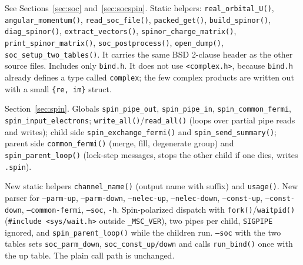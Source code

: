\documentclass[11pt,a4paper]{article}
\newcommand{\file}[1]{\texttt{#1}}
\newcommand{\fn}[1]{\texttt{#1()}}
\newcommand{\var}[1]{\texttt{#1}}
\newcommand{\opt}[1]{\texttt{#1}}
\begin{document}
\begin{description}[style=nextline,leftmargin=1.2em]
\item[\file{tightbind/soc.c} (new, about 960 lines)] See Sections~\ref{sec:soc}
  and~\ref{sec:socspin}. Static helpers: \fn{real\_orbital\_U}, \fn{angular\_momentum},
  \fn{read\_soc\_file}, \fn{packed\_get}, \fn{build\_spinor}, \fn{diag\_spinor},
  \fn{extract\_vectors}, \fn{spinor\_charge\_matrix}, \fn{print\_spinor\_matrix},
  \fn{soc\_postprocess}, \fn{open\_dump}, \fn{soc\_setup\_two\_tables}. It carries
  the same BSD 2-clause header as the other source files. Includes only
  \file{bind.h}. It does not use \texttt{<complex.h>}, because \file{bind.h} already
  defines a type called \texttt{complex}; the few complex products are written out with a
  small \texttt{\{re, im\}} struct.

\item[\file{tightbind/spin.c} (new, about 330 lines)] Section~\ref{sec:spin}.
  Globals \var{spin\_pipe\_out}, \var{spin\_pipe\_in}, \var{spin\_common\_fermi},
  \var{spin\_input\_electrons}; \fn{write\_all}/\fn{read\_all} (loops over partial
  pipe reads and writes); child side \fn{spin\_exchange\_fermi} and
  \fn{spin\_send\_summary}; parent side \fn{common\_fermi} (merge, fill, degenerate group)
  and \fn{spin\_parent\_loop} (lock-step messages, stops the other child if one dies,
  writes \texttt{.spin}).

\item[\file{tightbind/main.c}] New static helpers \fn{channel\_name} (output name with
  suffix) and \fn{usage}. New parser for \opt{--parm-up}, \opt{--parm-down},
  \opt{--nelec-up}, \opt{--nelec-down}, \opt{--const-up}, \opt{--const-down},
  \opt{--common-fermi}, \opt{--soc}, \opt{-h}. Spin-polarized dispatch with
  \fn{fork}/\fn{waitpid} (\texttt{\#include <sys/wait.h>} outside \texttt{\_MSC\_VER}),
  two pipes per child, \texttt{SIGPIPE} ignored, and \fn{spin\_parent\_loop} while the
  children run. \opt{--soc} with the two tables sets \var{soc\_parm\_down},
  \var{soc\_const\_up/down} and calls \fn{run\_bind} once with the up table. The plain
  call path is unchanged.


\end{description}
\end{document}
